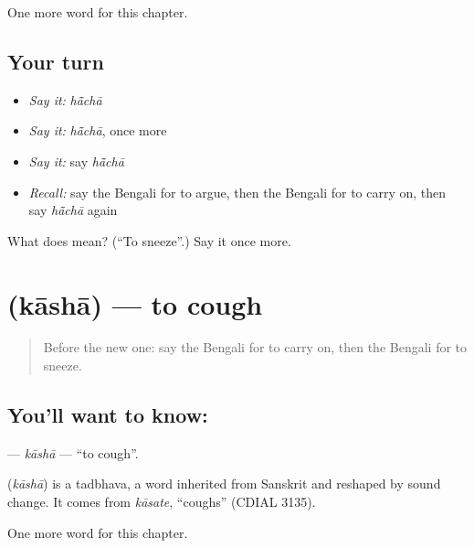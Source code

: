 \begin{grammarlens}[title={What you've built}]
One more word for this chapter.
\end{grammarlens}

\subsection*{Your turn}
\begin{itemize}
\raggedright
  \item \emph{Say it:} \emph{hā̃chā}
  \item \emph{Say it:} \emph{hā̃chā}, once more
  \item \emph{Say it:} say \emph{hā̃chā}
  \item \emph{Recall:} say the Bengali for to argue, then the Bengali for to carry on, then say \emph{hā̃chā} again
\end{itemize}

\begin{tcolorbox}[breakable,colback=teal!4,colframe=teal!35!black,title={Before you move on}]
What does  mean? (\textquotedblleft{}To sneeze\textquotedblright{}.) Say it once more.
\end{tcolorbox}
\section[\texorpdfstring{\bn{কাশা} (kāshā)}{কাশা (kāshā)}]{ (kāshā) — to cough}

\label{lesson:BN-C150-kasha}



\begin{quote}
Before the new one: say the Bengali for to carry on, then the Bengali for to sneeze.
\end{quote}

\subsection*{You'll want to know: }
\textbf{} — \emph{kāshā} — \textquotedblleft{}to cough\textquotedblright{}.

\begin{cousinweb}
\textbf{} (\emph{kāshā}) is a tadbhava, a word inherited from Sanskrit and reshaped by sound change. It comes from \emph{kāsate}, \textquotedblleft{}coughs\textquotedblright{} (CDIAL 3135).
\end{cousinweb}

\begin{grammarlens}[title={What you've built}]
One more word for this chapter.
\end{grammarlens}

